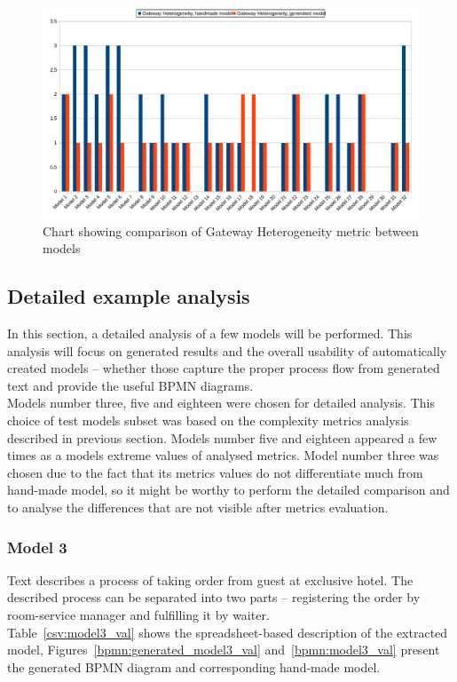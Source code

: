 \begin{figure}[p]
	\centering
	\includegraphics[width=0.95\textheight, angle=90]{./images/heter_chart.pdf}
	\caption{Chart showing comparison of Gateway Heterogeneity metric between models}
	\label{bpmn:heter_chart}
\end{figure}

\subsection{Detailed example analysis}
\label{sec:detailed-example}
In this section, a detailed analysis of a few models will be performed. This analysis will focus on generated results and the overall usability of automatically created models -- whether those capture the proper process flow from generated text and provide the useful BPMN diagrams.\\
Models number three, five and eighteen were chosen for detailed analysis. This choice of test models subset was based on the complexity metrics analysis described in previous section. Models number five and eighteen appeared a few times as a models extreme values of analysed metrics. Model number three was chosen due to the fact that its metrics values do not differentiate much from hand-made model, so it might be worthy to perform the detailed comparison and to analyse the differences that are not visible after metrics evaluation.

\subsubsection{Model 3}
\begin{tcolorbox}[
	breakable,
	arc=0mm,
	left=1pt,
	right = 1pt,
	boxrule=0mm,
	colback = {white},
	]
	\texttt{}
\end{tcolorbox}
\label{txt:model3_val}
Text describes a process of taking order from guest at exclusive hotel. The described process can be separated into two parts -- registering the order by room-service manager and fulfilling it by waiter.\\
Table~\ref{csv:model3_val} shows the spreadsheet-based description of the extracted model, Figures~\ref{bpmn:generated_model3_val} and~\ref{bpmn:model3_val} present the generated BPMN diagram and corresponding hand-made model.

